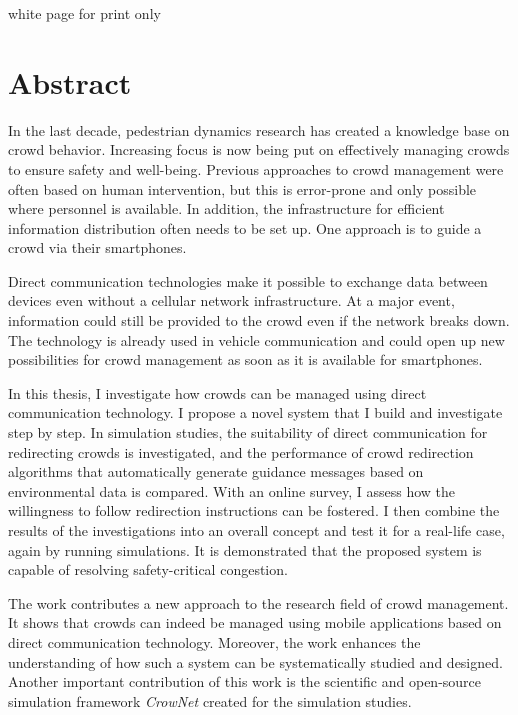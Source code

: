 \documentclass[
							a4paper, 
							11pt, 
							openany, 
							bibtotoc, 
							parskip=half, 
   							headings=normal,
   							bibliography=totoc
						]{scrreprt}
\begin{document}









\pagestyle{empty}


{\color{white} white page for print only}

\newpage


\section*{\centering Abstract}
In the last decade, pedestrian dynamics research has created a knowledge base on crowd behavior. Increasing focus is now being put on effectively managing crowds to ensure safety and well-being. Previous approaches to crowd management were often based on human intervention, but this is error-prone and only possible where personnel is available. In addition, the infrastructure for efficient information distribution often needs to be set up.
One approach is to guide a crowd via their smartphones. 

Direct communication technologies make it possible to exchange data between devices even without a cellular network infrastructure. At a major event, information could still be provided to the crowd even if the network breaks down. The technology is already used in vehicle communication and could open up new possibilities for crowd management as soon as it is available for smartphones. 


In this thesis, I investigate how crowds can be managed using direct communication technology. I propose a novel system that I build and investigate step by step. In simulation studies, the suitability of direct communication for redirecting crowds is investigated, and the performance of crowd redirection algorithms that automatically generate guidance messages based on environmental data is compared. With an online survey, I assess how the willingness to follow redirection instructions can be fostered. I then combine the results of the investigations into an overall concept and test it for a real-life case, again by running simulations. It is demonstrated that the proposed system is capable of resolving safety-critical congestion.

The work contributes a new approach to the research field of crowd management. It shows that crowds can indeed be managed using mobile applications based on direct communication technology. Moreover, the work enhances the understanding of how such a system can be systematically studied and designed. Another important contribution of this work is the scientific and open-source simulation framework \textit{CrowNet} created for the simulation studies.
\end{document}
